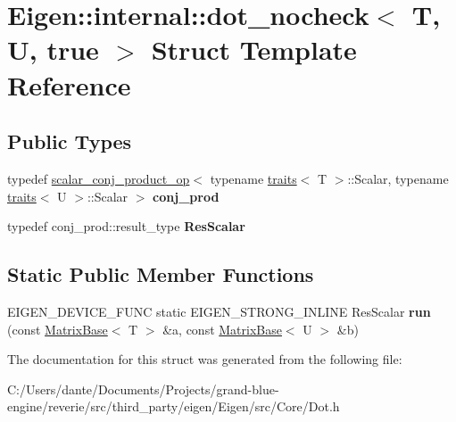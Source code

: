 \hypertarget{struct_eigen_1_1internal_1_1dot__nocheck_3_01_t_00_01_u_00_01true_01_4}{}\section{Eigen\+::internal\+::dot\+\_\+nocheck$<$ T, U, true $>$ Struct Template Reference}
\label{struct_eigen_1_1internal_1_1dot__nocheck_3_01_t_00_01_u_00_01true_01_4}
\subsection*{Public Types}
\begin{DoxyCompactItemize}
\item 
\mbox{\label{struct_eigen_1_1internal_1_1dot__nocheck_3_01_t_00_01_u_00_01true_01_4_af46c6f58464fb29fbf8da63fd2f12f8a}} 
typedef \mbox{\hyperlink{struct_eigen_1_1internal_1_1scalar__conj__product__op}{scalar\+\_\+conj\+\_\+product\+\_\+op}}$<$ typename \mbox{\hyperlink{struct_eigen_1_1internal_1_1traits}{traits}}$<$ T $>$\+::Scalar, typename \mbox{\hyperlink{struct_eigen_1_1internal_1_1traits}{traits}}$<$ U $>$\+::Scalar $>$ {\bfseries conj\+\_\+prod}
\item 
\mbox{\label{struct_eigen_1_1internal_1_1dot__nocheck_3_01_t_00_01_u_00_01true_01_4_adcd4282d8e49e661ed8e123f92bdb308}} 
typedef conj\+\_\+prod\+::result\+\_\+type {\bfseries Res\+Scalar}
\end{DoxyCompactItemize}
\subsection*{Static Public Member Functions}
\begin{DoxyCompactItemize}
\item 
\mbox{\label{struct_eigen_1_1internal_1_1dot__nocheck_3_01_t_00_01_u_00_01true_01_4_a26fd72a7f24a74dd63d13268b05458a4}} 
E\+I\+G\+E\+N\+\_\+\+D\+E\+V\+I\+C\+E\+\_\+\+F\+U\+NC static E\+I\+G\+E\+N\+\_\+\+S\+T\+R\+O\+N\+G\+\_\+\+I\+N\+L\+I\+NE Res\+Scalar {\bfseries run} (const \mbox{\hyperlink{class_eigen_1_1_matrix_base}{Matrix\+Base}}$<$ T $>$ \&a, const \mbox{\hyperlink{class_eigen_1_1_matrix_base}{Matrix\+Base}}$<$ U $>$ \&b)
\end{DoxyCompactItemize}


The documentation for this struct was generated from the following file\+:\begin{DoxyCompactItemize}
\item 
C\+:/\+Users/dante/\+Documents/\+Projects/grand-\/blue-\/engine/reverie/src/third\+\_\+party/eigen/\+Eigen/src/\+Core/Dot.\+h\end{DoxyCompactItemize}
